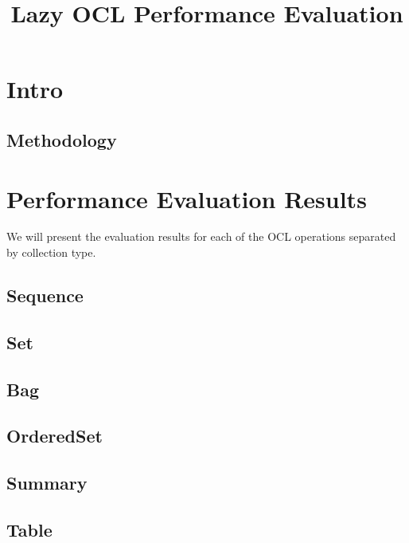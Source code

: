 \documentclass{report}
\begin{document}
\title{Lazy OCL Performance Evaluation}

\part{Intro}

\chapter{Methodology}



\part{Performance Evaluation Results}

We will present the evaluation results for each of the OCL operations separated
by collection type.

\chapter{Sequence}



\chapter{Set}



\chapter{Bag}



\chapter{OrderedSet}



\chapter{Summary}



\chapter{Table}


\end{document}
